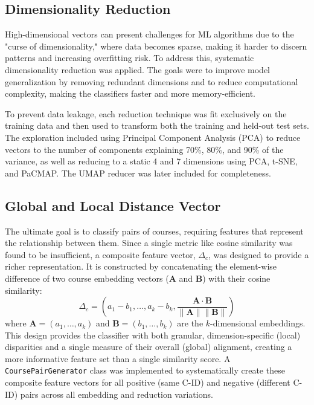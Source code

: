 \subsection{Dimensionality Reduction}\label{ch:3.5.1}
High-dimensional vectors can present challenges for ML algorithms due to the "curse of dimensionality," where data becomes sparse, making it harder to discern patterns and increasing overfitting risk. To address this, systematic dimensionality reduction was applied. The goals were to improve model generalization by removing redundant dimensions and to reduce computational complexity, making the classifiers faster and more memory-efficient.

To prevent data leakage, each reduction technique was fit exclusively on the training data and then used to transform both the training and held-out test sets. The exploration included using Principal Component Analysis (PCA) to reduce vectors to the number of components explaining 70\%, 80\%, and 90\% of the variance, as well as reducing to a static 4 and 7 dimensions using PCA, t-SNE, and PaCMAP.  The UMAP reducer was later included for completeness.

\subsection{Global and Local Distance Vector}\label{ch:3.5.2}
The ultimate goal is to classify pairs of courses, requiring features that represent the relationship between them. Since a single metric like cosine similarity was found to be insufficient, a composite feature vector, \(\Delta_c\), was designed to provide a richer representation. It is constructed by concatenating the element-wise difference of two course embedding vectors (\(\mathbf{A}\) and \(\mathbf{B}\)) with their cosine similarity:
\[ \Delta_c = \left(a_1 - b_1, \dots, a_k - b_k, \frac{\mathbf{A}\cdot\mathbf{B}}{\parallel \mathbf{A} \parallel \parallel \mathbf{B} \parallel } \right) \]
where \(\mathbf{A} = (a_1, \dots, a_k) \) and \(\mathbf{B} = (b_1, \dots, b_k) \) are the \(k\)-dimensional embeddings. This design provides the classifier with both granular, dimension-specific (local) disparities and a single measure of their overall (global) alignment, creating a more informative feature set than a single similarity score. A \verb|CoursePairGenerator| class was implemented to systematically create these composite feature vectors for all positive (same C-ID) and negative (different C-ID) pairs across all embedding and reduction variations.


